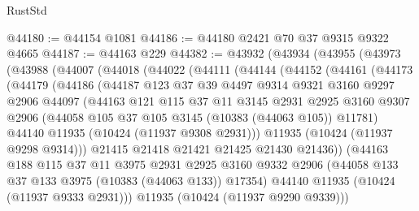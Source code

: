 \begin{lexlean}{RustStd}
\begin{coremodule}
@44180 := @44154 @1081
@44186 := @44180 @2421 @70 @37 @9315 @9322 @4665
@44187 := @44163 @229
@44382 := @43932
    (@43934
      (@43955
        (@43973
          (@43988
            (@44007
              (@44018
                (@44022
                  (@44111
                    (@44144
                      (@44152
                        (@44161
                          (@44173
                            (@44179
                              (@44186
                                (@44187
                                  @123
                                  @37
                                  @39
                                  @4497
                                  @9314
                                  @9321
                                  @3160
                                  @9297
                                  @2906
                                  @44097
                                  (@44163
                                    @121
                                    @115
                                    @37
                                    @11
                                    @3145
                                    @2931
                                    @2925
                                    @3160
                                    @9307
                                    @2906
                                    (@44058 @105 @37 @105 @3145 (@10383 (@44063 @105)) @11781)
                                    @44140
                                    @11935
                                    (@10424 (@11937 @9308 @2931)))
                                  @11935
                                  (@10424 (@11937 @9298 @9314)))
                                @21415
                                @21418
                                @21421
                                @21425
                                @21430
                                @21436))
                            (@44163
                              @188
                              @115
                              @37
                              @11
                              @3975
                              @2931
                              @2925
                              @3160
                              @9332
                              @2906
                              (@44058 @133 @37 @133 @3975 (@10383 (@44063 @133)) @17354)
                              @44140
                              @11935
                              (@10424 (@11937 @9333 @2931)))
                            @11935
                            (@10424 (@11937 @9290 @9339)))

\end{coremodule}
\end{lexlean}
